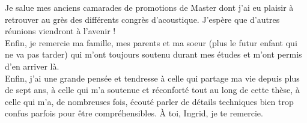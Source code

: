 Je salue mes anciens camarades de promotions de Master dont j'ai eu plaisir à retrouver au grès des différents congrès d'acoustique. J'espère que d'autres réunions viendront à l'avenir !\\

Enfin, je remercie ma famille, mes parents et ma soeur (plus le futur enfant qui ne va pas tarder) qui m'ont toujours soutenu durant mes études et m'ont permis d'en arriver là.\\

Enfin, j'ai une grande pensée et tendresse à celle qui partage ma vie depuis plus de sept ans, à celle qui m'a soutenue et réconforté tout au long de cette thèse, à celle qui m'a, de nombreuses fois, écouté parler de détails techniques bien trop confus parfois pour être compréhensibles. \`A toi, Ingrid, je te remercie.\\


